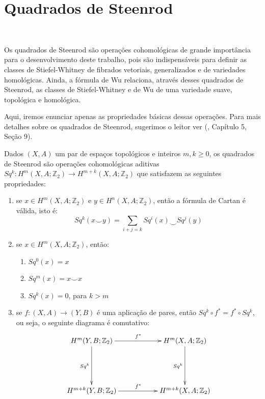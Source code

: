 \documentclass[12pt,oneside]{book} %
\newcommand{\ds}{\displaystyle}
\newcommand{\Z}{\mathbb{Z}}
\newcommand{\ccup}{\smile}
\begin{document}
\section{Quadrados de Steenrod}\label{ap_steenrod}

\

\par Os quadrados de Steenrod  são operações cohomológicas de grande importância para o desenvolvimento deste trabalho, pois são indispensáveis para definir as classes de Stiefel-Whitney de fibrados vetoriais, generalizados e de variedades homológicas. Ainda, a fórmula de Wu relaciona, através desses quadrados de Steenrod, as classes de Stiefel-Whitney e de Wu de uma variedade suave, topológica e homológica.

\par Aqui, iremos enunciar apenas as propriedades básicas dessas operações. Para mais detalhes sobre os quadrados de Steenrod, sugerimos o leitor ver (\cite{spanier}, Capítulo 5, Seção 9).

\par Dados $(X,A)$ um par de espaços topológicos e inteiros $m,k\geq 0$, os quadrados de Steenrod são operações cohomológicas aditivas $Sq^{k}:H^{m}(X,A;\Z_{2})\to H^{m+k}(X,A;\Z_{2})$ que satisfazem as seguintes propriedades:

\begin{enumerate}
	\item se $x\in H^{m}(X,A;\Z_{2})$ e $y\in H^{n}(X,A;\Z_{2})$, então a fórmula de Cartan é válida, isto é: 	
	$$ Sq^{k}(x\ccup y)=\ds\sum_{i+j=k}Sq^{i}(x)\ccup Sq^{j}(y) $$	
	\item se $x\in H^{m}(X,A;\Z_{2})$, então: 
	\begin{enumerate}
		\item $Sq^{0}(x)=x$		
		\item $Sq^{m}(x)=x\ccup x$		
		\item $Sq^{k}(x)=0$, para $k>m$
	\end{enumerate}
	
	\item se $f:(X,A)\to (Y,B)$ é uma aplicação de pares, então $Sq^{k}\circ f^{*}=f^{*}\circ Sq^{k}$, ou seja, o seguinte diagrama é comutativo:
	$$\xymatrix @C=0.5cm {
		H^{m}(Y,B;\Z_{2}) \ar[rrr]^{f^{*}} \ar[dd]_{Sq^{k}} & & & H^{m}(X,A;\Z_{2}) \ar[dd]_{Sq^{k}} \\
		& & & \\
		H^{m+k}(Y,B;\Z_{2}) \ar[rrr]^{f^{*}} & & & H^{m+k}(X,A;\Z_{2})
	}$$ 
\end{enumerate}
\end{document}
